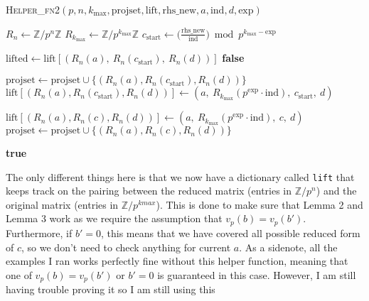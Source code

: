 \documentclass[letterpaper,12pt]{article}
\newcommand{\Z}{\mathbb{Z}}
\begin{document}
\begin{algorithm}
\caption{\textsc{Helper\_fn2}$(p, n, k_{\max}, \text{projset}, \text{lift}, \text{rhs\_new}, a, \text{ind}, d, \text{exp})$}
\begin{algorithmic}[1]
\State $R_n \gets \mathbb{Z}/p^n\mathbb{Z}$
\State $R_{k_{\max}} \gets \mathbb{Z}/p^{k_{\max}}\mathbb{Z}$
\State $c_{\text{start}} \gets \bigl( \frac{\text{rhs\_new}}{\text{ind}} \bigr) \bmod p^{k_{\max} - \text{exp}}$

    \State $\text{lifted} \gets \text{lift}[(R_n(a),\ R_n(c_{\text{start}}),\ R_n(d))]$
        \State \Return \textbf{false}
    \EndIf
\EndIf

\State $\text{projset} \gets \text{projset} \cup \{(R_n(a), R_n(c_{\text{start}}), R_n(d))\}$
\State $\text{lift}[(R_n(a), R_n(c_{\text{start}}), R_n(d))] \gets (a,\ R_{k_{\max}}(p^{\text{exp}} \cdot \text{ind}),\ c_{\text{start}},\ d)$

    \State $\text{lift}[(R_n(a), R_n(c), R_n(d))] \gets (a,\ R_{k_{\max}}(p^{\text{exp}} \cdot \text{ind}),\ c,\ d)$
    \State $\text{projset} \gets \text{projset} \cup \{(R_n(a), R_n(c), R_n(d))\}$
\EndFor

\State \Return \textbf{true}
\end{algorithmic}
\end{algorithm}

The only different things here is that we now have a dictionary called
\texttt{lift} that keeps track on the pairing between the reduced matrix
(entries in $\Z/p^n$) and the original matrix (entries in $\Z/p^{kmax}$).
This is done to make sure that Lemma 2 and Lemma 3 work as 
we require the assumption that $v_p(b) = v_p(b')$.
Furthermore, if $b' = 0$, this means that we have covered 
all possible reduced form of $c$, so we don't need to 
check anything for current $a$.
As a sidenote, all the examples I ran works perfectly fine 
without this helper function, meaning that one of
$v_p(b) = v_p(b')$ or $b' = 0$ is guaranteed in this case.
However, I am still having trouble proving it so I am still using this 

\end{document}
